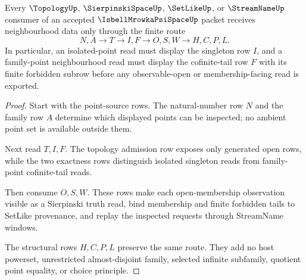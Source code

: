 \begin{theorem}
\label{thm:isbell-mrowka-psi-space-topology-route}
Every $\TopologyUp$, $\SierpinskiSpaceUp$, $\SetLikeUp$, or $\StreamNameUp$ consumer of an accepted $\IsbellMrowkaPsiSpaceUp$ packet receives neighbourhood data only through the finite route
$$
N,A \longrightarrow T \longrightarrow I,F \longrightarrow O,S,W \longrightarrow H,C,P,L .
$$
In particular, an isolated-point read must display the singleton row $I$, and a family-point neighbourhood read must display the cofinite-tail row $F$ with its finite forbidden subrow before any observable-open or membership-facing read is exported.
\end{theorem}
\begin{proof}
Start with the point-source rows. The natural-number row $N$ and the family row $A$ determine which displayed points can be inspected; no ambient point set is available outside them.

Next read $T,I,F$. The topology admission row exposes only generated open rows, while the two exactness rows distinguish isolated singleton reads from family-point cofinite-tail reads.

Then consume $O,S,W$. These rows make each open-membership observation visible as a Sierpinski truth read, bind membership and finite forbidden tails to SetLike provenance, and replay the inspected requests through StreamName windows.

The structural rows $H,C,P,L$ preserve the same route. They add no host powerset, unrestricted almost-disjoint family, selected infinite subfamily, quotient point equality, or choice principle.
\end{proof}



